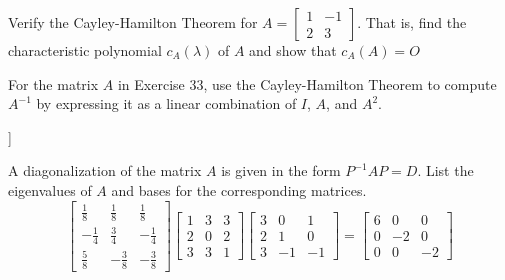 \documentclass[12pt,letterpaper]{hmcpset}
\begin{document}
\newpage

\begin{problem}[4.3.33]
    Verify the Cayley-Hamilton Theorem for $A=\begin{bmatrix}
    1 & -1 \\ 
    2 & 3
    \end{bmatrix} $. That is, find the characteristic polynomial $c_A(\lambda)$ of $A$ and show that $c_A(A) = O$
\end{problem}

\begin{solution}
    \vfill
\end{solution}

\newpage

\begin{problem}[4.3.37]
    For the matrix $A$ in Exercise 33, use the Cayley-Hamilton Theorem to compute $A^{-1}$ by expressing it as a linear combination of $I$, $A$, and $A^2$.
\end{problem}

\begin{solution}
    \vfill
\end{solution}]


\newpage

\begin{problem}[4.4.7]
    A diagonalization of the matrix $A$ is given in the form $P^{-1}AP=D$. List the eigenvalues of $A$ and bases for the corresponding matrices.
    \[
    \begin{bmatrix}
    \frac{1}{8} & \frac{1}{8} & \frac{1}{8} \\ 
    -\frac{1}{4} & \frac{3}{4} & -\frac{1}{4} \\ 
    \frac{5}{8} & -\frac{3}{8} & -\frac{3}{8}
    \end{bmatrix}
    \begin{bmatrix}
    1 & 3 & 3 \\ 
    2 & 0 & 2 \\ 
    3 & 3 & 1
    \end{bmatrix} 
    \begin{bmatrix}
    3 & 0 & 1 \\ 
    2 & 1 & 0 \\ 
    3 & -1 & -1
    \end{bmatrix}=
    \begin{bmatrix}
    6 & 0 & 0 \\ 
    0 & -2 & 0 \\ 
    0 & 0 & -2
    \end{bmatrix} 
    \]
\end{problem}
\end{document}
